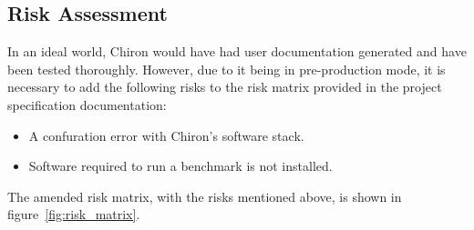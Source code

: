 \documentclass[12pt,a4paper]{article}
\begin{document}
        
        \subsection{Risk Assessment}
        \label{sub:risk_assessment}

            In an ideal world, Chiron would have had user documentation generated and have been tested thoroughly. However, due to it being in pre-production mode, it is necessary to add the following risks to the risk matrix provided in the project specification documentation:

            \begin{itemize}
                \item A confuration error with Chiron's software stack.
                \item Software required to run a benchmark is not installed.
            \end{itemize}

            The amended risk matrix, with the risks mentioned above, is shown in figure~\ref{fig:risk_matrix}.
\end{document}
